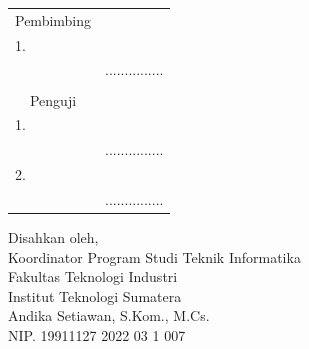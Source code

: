 \begin{center}
	\justify
    \setlength{\tabcolsep}{0pt}
    \begin{tabular}{ m{0.5cm}  m{} >{\centering\arraybackslash}m{}}
        \multicolumn{2}{c}{\hspace*{70pt}Pembimbing} & \multicolumn{1}{c}{} \\[2pt]
		1. & \printnamadosbinga & \\
		 & \printnipdosbinga & ............... \\%
		& \\
		\multicolumn{2}{c}{\hspace*{70pt}Penguji} & \multicolumn{1}{c}{} \\[2pt]
		1. & \printnamapengujia & \\
		& \printnippengujia & ............... \\[4pt]
		2. & \printnamapengujib & \\
		& \printnippengujib & ............... \\
    \end{tabular}

	\begin{center}
		\fontsize{10pt}{10pt}
        \vspace{0.25cm}
		Disahkan oleh,\\
		Koordinator Program Studi Teknik Informatika\\
		Fakultas Teknologi Industri\\
		Institut Teknologi Sumatera
		\vspace{1.55cm}\\
		Andika Setiawan, S.Kom., M.Cs. \\ %
		NIP. 19911127 2022 03 1 007 \\
	\end{center}
	\vfill

\end{center}
\clearpage
